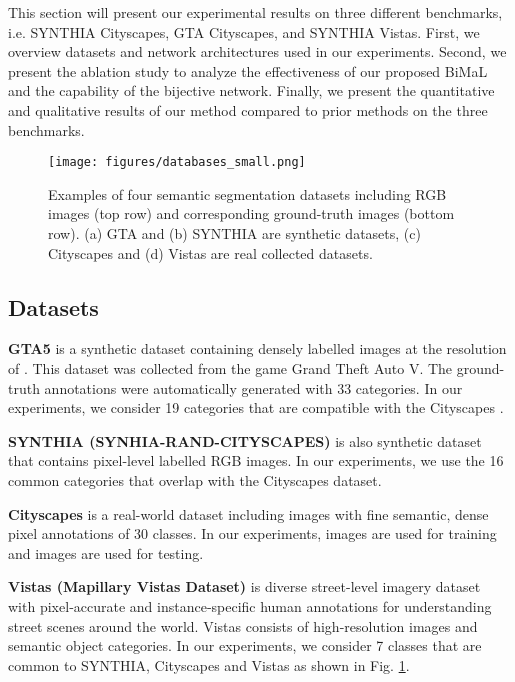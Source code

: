 \documentclass[10pt,twocolumn,letterpaper]{article}
\begin{document}
This section will present our experimental results on three different benchmarks, i.e. SYNTHIA  Cityscapes, GTA  Cityscapes, and SYNTHIA  Vistas. First, we overview datasets and network architectures used in our experiments. Second, we present the ablation study to analyze the effectiveness of our proposed BiMaL and the capability of the bijective network. Finally, we present the quantitative and qualitative results of our method compared to prior methods on the three benchmarks.


\begin{figure}[t]
    \centering
    \texttt{[image: figures/databases\_small.png]}
    \caption{Examples of four semantic segmentation datasets including RGB images (top row) and corresponding ground-truth images (bottom row). (a) GTA and (b) SYNTHIA are synthetic datasets, (c) Cityscapes and (d) Vistas are real collected datasets.} \label{fig:database}
    \vspace{-4mm}
\end{figure}

\subsection{Datasets}

\textbf{GTA5} \cite{Richter_2016_ECCV} is a synthetic dataset containing  densely labelled images at the resolution of . This dataset was collected from the game Grand Theft Auto V. The ground-truth annotations were automatically generated with 33 categories. In our experiments, we consider 19 categories that are compatible with the Cityscapes \cite{cordts2016cityscapes}.



\textbf{SYNTHIA (SYNHIA-RAND-CITYSCAPES) }\cite{Ros_2016_CVPR} is also synthetic dataset that contains  pixel-level labelled RGB images. In our experiments, we use the 16 common categories that overlap with the Cityscapes dataset.

\textbf{Cityscapes} \cite{cordts2016cityscapes} is a real-world dataset including  images with fine semantic, dense pixel annotations of 30 classes.
In our experiments,  images are used for training and  images are used for testing.






\textbf{Vistas (Mapillary Vistas Dataset)} \cite{MVD2017} is diverse street-level imagery dataset with pixel‑accurate and instance‑specific human annotations for understanding street scenes around the world. Vistas consists of  high-resolution images and  semantic object categories. In our experiments, we consider 7 classes that are common to SYNTHIA, Cityscapes and Vistas as shown in Fig. \ref{fig:database}.
\end{document}
